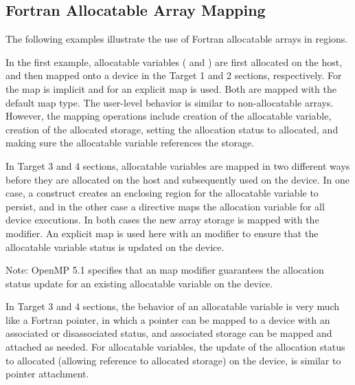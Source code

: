 \pagebreak
\begin{fortranspecific}[4ex]
\section{Fortran Allocatable Array Mapping}
\label{sec:fort_allocatable_array_mapping}


The following examples illustrate the use of Fortran allocatable arrays in  regions.

In the first example, allocatable variables ( and ) are first allocated
on the host, and then mapped onto a device in the Target 1 and 2 sections, respectively.
For  the map is implicit and for  an explicit map is used.
Both are mapped with the default  map type.
The user-level behavior is similar to non-allocatable arrays.
However, the mapping operations include creation of the allocatable variable,
creation of the allocated storage, setting the allocation status to allocated,
and making sure the allocatable variable references the storage.

In Target 3 and 4 sections, allocatable variables are mapped in two
different ways before they are allocated on the host and subsequently used on the device.
In one case, a  construct creates an enclosing region for
the allocatable variable to persist, and in the other case a
 directive maps the allocation variable for all device executions.
In both cases the new array storage is mapped  with the  modifier.
An explicit map is used here with an  modifier to ensure that the allocatable
variable status is updated on the device.

Note: OpenMP 5.1 specifies that an  map modifier guarantees the
allocation status update for an existing allocatable variable on the device.

In Target 3 and 4 sections, the behavior of an allocatable variable is very
much like a Fortran pointer, in which a pointer can be mapped to a device with an associated
or disassociated status, and associated storage can be mapped and attached as needed.
For allocatable variables, the update of the allocation status to allocated (allowing
reference to allocated storage) on the device, is similar to pointer attachment.


\end{fortranspecific}
